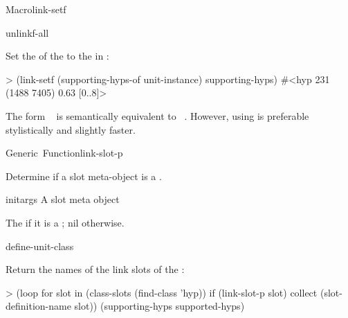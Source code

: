 \documentclass[10pt,twoside,english,pdftex]{article}
\begin{document}
\begin{functiondoc}{Macro}{link-setf}
\begin{alsos}{unlinkf-all}
\also[linkf]
\also[unlinkf]
\end{alsos}

\fnexample Set the   of the
  to the  in
:
%
\W\supp
\begin{example}
> (link-setf (supporting-hyps-of unit-instance) supporting-hyps)
#<hyp 231 (1488 7405) 0.63 [0..8]>
\end{example}

\fnnote 
{}%
The form \mbox{ 
  } is semantically equivalent to
\mbox{
  \code{)}}.  However, using
\textbf{} is preferable stylistically and
slightly faster.

\end{functiondoc}


\begin{functiondoc}{Generic~Function}{link-slot-p}{
    \returns{} }

\fnsyntax

\fnpurpose Determine if a slot meta-object is a .

\fnmethods
{}

\fnpackage {}

\fnmodule {}

\fnargs
\begin{args}{initargs}
\arg[slot] A slot meta object
\end{args}

\fnreturns The  if it is a ; nil otherwise.

\begin{alsos}{define-unit-class}
\end{alsos}

\fnexample
Return the names of the link slots of the  :
%
\W\supp
\begin{example}
> (loop for slot in (class-slots (find-class 'hyp)) 
     if (link-slot-p slot) collect (slot-definition-name slot))
(supporting-hyps supported-hyps)
\end{example}

\end{functiondoc}
\end{document}
